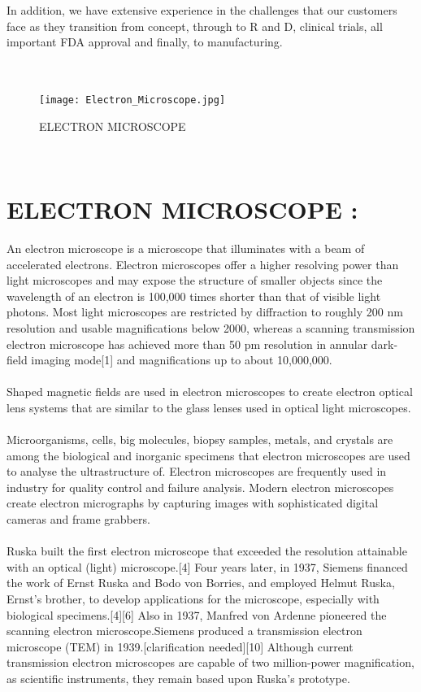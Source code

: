 \documentclass[a4paper,12pt]{article}
\begin{document}
In addition, we have extensive experience in the challenges that our customers face as they transition from concept, through to R and D, clinical trials, all important FDA approval and finally, to manufacturing.
\\
\\ 
\clearpage
\\

\begin{figure}
\centering
\texttt{[image: Electron\_Microscope.jpg]}
\caption{ELECTRON MICROSCOPE  }
\end{figure}
\\
\section{ELECTRON MICROSCOPE :}


\medspace
 
An electron microscope is a microscope that illuminates with a beam of accelerated electrons. Electron microscopes offer a higher resolving power than light microscopes and may expose the structure of smaller objects since the wavelength of an electron is 100,000 times shorter than that of visible light photons. Most light microscopes are restricted by diffraction to roughly 200 nm resolution and usable magnifications below 2000, whereas a scanning transmission electron microscope has achieved more than 50 pm resolution in annular dark-field imaging mode[1] and magnifications up to about 10,000,000.
\\
\\
Shaped magnetic fields are used in electron microscopes to create electron optical lens systems that are similar to the glass lenses used in optical light microscopes.
\\
\\
Microorganisms, cells, big molecules, biopsy samples, metals, and crystals are among the biological and inorganic specimens that electron microscopes are used to analyse the ultrastructure of. Electron microscopes are frequently used in industry for quality control and failure analysis. Modern electron microscopes create electron micrographs by capturing images with sophisticated digital cameras and frame grabbers.
\\
\\
Ruska built the first electron microscope that exceeded the resolution attainable with an optical (light) microscope.[4] Four years later, in 1937, Siemens financed the work of Ernst Ruska and Bodo von Borries, and employed Helmut Ruska, Ernst's brother, to develop applications for the microscope, especially with biological specimens.[4][6] Also in 1937, Manfred von Ardenne pioneered the scanning electron microscope.Siemens produced a transmission electron microscope (TEM) in 1939.[clarification needed][10] Although current transmission electron microscopes are capable of two million-power magnification, as scientific instruments, they remain based upon Ruska's prototype.
 
\end{document}
